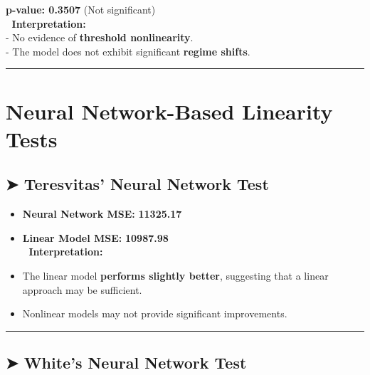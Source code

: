 \documentclass[11pt]{article}
\providecommand{\tightlist}{%
      \setlength{\itemsep}{0pt}\setlength{\parskip}{0pt}}
\begin{document}
\textbf{p-value: 0.3507} (Not significant)\\
📌 \textbf{Interpretation:}\\
- No evidence of \textbf{threshold nonlinearity}.\\
- The model does not exhibit significant \textbf{regime shifts}.

\begin{center}\rule{0.5\linewidth}{0.5pt}\end{center}

\hypertarget{neural-network-based-linearity-tests}{%
\section{\texorpdfstring{\textbf{Neural Network-Based Linearity
Tests}}{Neural Network-Based Linearity Tests}}\label{neural-network-based-linearity-tests}}

\hypertarget{teresvitas-neural-network-test}{%
\subsection{\texorpdfstring{\textbf{➤ Teresvitas' Neural Network
Test}}{➤ Teresvitas' Neural Network Test}}\label{teresvitas-neural-network-test}}

\begin{itemize}
\tightlist
\item
  \textbf{Neural Network MSE:} \textbf{11325.17}\\
\item
  \textbf{Linear Model MSE:} \textbf{10987.98}\\
  📌 \textbf{Interpretation:}\\
\item
  The linear model \textbf{performs slightly better}, suggesting that a
  linear approach may be sufficient.\\
\item
  Nonlinear models may not provide significant improvements.
\end{itemize}

\begin{center}\rule{0.5\linewidth}{0.5pt}\end{center}

\hypertarget{whites-neural-network-test}{%
\subsection{\texorpdfstring{\textbf{➤ White's Neural Network
Test}}{➤ White's Neural Network Test}}\label{whites-neural-network-test}}
\end{document}
